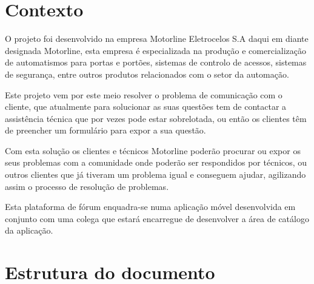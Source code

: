 

\section{Contexto}
O projeto foi desenvolvido na empresa Motorline Eletrocelos S.A daqui em diante designada Motorline, 
esta empresa é especializada na produção e comercialização de automatismos para portas e portões, 
sistemas de controlo de acessos, sistemas de segurança, entre outros produtos relacionados com o setor 
da automação.

Este projeto vem por este meio resolver o problema de comunicação com o cliente, que atualmente para 
solucionar as suas questões tem de contactar a assistência técnica que por vezes pode estar sobrelotada, 
ou então os clientes têm de preencher um formulário para expor a sua questão.

Com esta solução os clientes e técnicos Motorline poderão procurar ou expor os seus problemas com a 
comunidade onde poderão ser respondidos por técnicos, ou outros clientes que já tiveram um problema 
igual e conseguem ajudar, agilizando assim o processo de resolução de problemas.

Esta plataforma de fórum enquadra-se numa aplicação móvel desenvolvida em conjunto com uma 
colega que estará encarregue de desenvolver a área de catálogo da aplicação.

\newpage
\section{Estrutura do documento}

